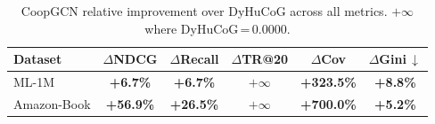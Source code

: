 \begin{table}[t]\centering
\caption{CoopGCN relative improvement over DyHuCoG across all metrics. $+\infty$ where DyHuCoG\,=\,0.0000.}
\label{tab:gain}
\begin{tabular}{l ccccc}\toprule
\textbf{Dataset} & $\Delta$\textbf{NDCG} & $\Delta$\textbf{Recall} & $\Delta$\textbf{TR@20} & $\Delta$\textbf{Cov} & $\Delta$\textbf{Gini\,$\downarrow$} \\
\midrule
ML-1M & \textbf{+6.7\%} & \textbf{+6.7\%} & $+\infty$ & \textbf{+323.5\%} & \textbf{+8.8\%} \\
Amazon-Book & \textbf{+56.9\%} & \textbf{+26.5\%} & $+\infty$ & \textbf{+700.0\%} & \textbf{+5.2\%} \\
\bottomrule
\end{tabular}
\end{table}